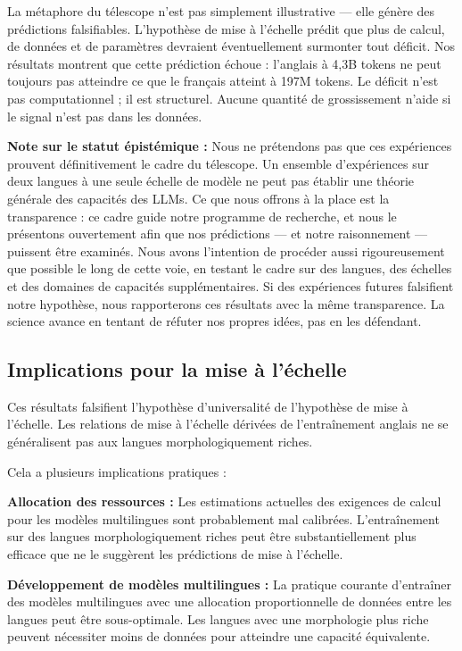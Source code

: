 \documentclass[11pt,a4paper]{article}
\begin{document}
La métaphore du télescope n'est pas simplement illustrative --- elle génère des prédictions falsifiables. L'hypothèse de mise à l'échelle prédit que plus de calcul, de données et de paramètres devraient éventuellement surmonter tout déficit. Nos résultats montrent que cette prédiction échoue : l'anglais à 4,3B tokens ne peut toujours pas atteindre ce que le français atteint à 197M tokens. Le déficit n'est pas computationnel ; il est structurel. Aucune quantité de grossissement n'aide si le signal n'est pas dans les données.

\textbf{Note sur le statut épistémique :} Nous ne prétendons pas que ces expériences prouvent définitivement le cadre du télescope. Un ensemble d'expériences sur deux langues à une seule échelle de modèle ne peut pas établir une théorie générale des capacités des LLMs. Ce que nous offrons à la place est la transparence : ce cadre guide notre programme de recherche, et nous le présentons ouvertement afin que nos prédictions --- et notre raisonnement --- puissent être examinés. Nous avons l'intention de procéder aussi rigoureusement que possible le long de cette voie, en testant le cadre sur des langues, des échelles et des domaines de capacités supplémentaires. Si des expériences futures falsifient notre hypothèse, nous rapporterons ces résultats avec la même transparence. La science avance en tentant de réfuter nos propres idées, pas en les défendant.

\subsection{Implications pour la mise à l'échelle}

Ces résultats falsifient l'hypothèse d'universalité de l'hypothèse de mise à l'échelle. Les relations de mise à l'échelle dérivées de l'entraînement anglais ne se généralisent pas aux langues morphologiquement riches.

Cela a plusieurs implications pratiques :

\textbf{Allocation des ressources :} Les estimations actuelles des exigences de calcul pour les modèles multilingues sont probablement mal calibrées. L'entraînement sur des langues morphologiquement riches peut être substantiellement plus efficace que ne le suggèrent les prédictions de mise à l'échelle.

\textbf{Développement de modèles multilingues :} La pratique courante d'entraîner des modèles multilingues avec une allocation proportionnelle de données entre les langues peut être sous-optimale. Les langues avec une morphologie plus riche peuvent nécessiter moins de données pour atteindre une capacité équivalente.
\end{document}
